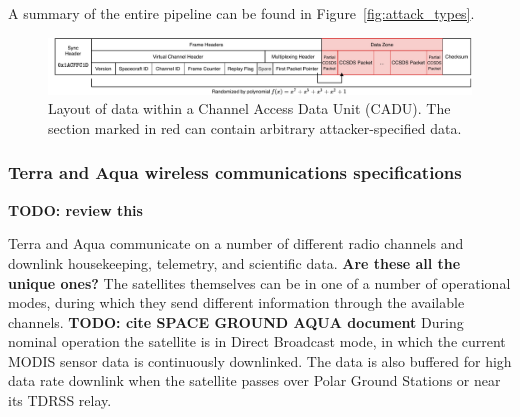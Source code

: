 A summary of the entire pipeline can be found in Figure~\ref{fig:attack_types}.

\begin{figure}
    \centering
    \includegraphics[width=\textwidth]{diagrams/cadu_diagram.pdf}
    \caption{Layout of data within a Channel Access Data Unit (CADU). The section marked in red can contain arbitrary attacker-specified data.}
    \label{fig:cadu_diagram}
\end{figure}

\subsubsection{Terra and Aqua wireless communications specifications} %

\textbf{TODO: review this}



Terra and Aqua communicate on a number of different radio channels and downlink housekeeping, telemetry, and scientific data. \textbf{Are these all the unique ones?}
The satellites themselves can be in one of a number of operational modes, during which they send different information through the available channels. \textbf{TODO: cite SPACE GROUND AQUA document} %
During nominal operation the satellite is in Direct Broadcast mode, in which the current MODIS sensor data is continuously downlinked.
The data is also buffered for high data rate downlink when the satellite passes over Polar Ground Stations or near its TDRSS relay.

